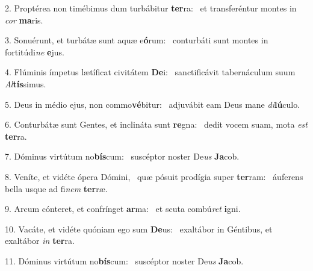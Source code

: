 2. Proptérea non timébimus dum turbábitur \textbf{ter}ra: \ast\  et transferéntur montes in \textit{cor} \textbf{ma}ris.\

3. Sonuérunt, et turbátæ sunt aquæ e\textbf{ó}rum: \ast\  conturbáti sunt montes in fortitúdi\textit{ne} \textbf{e}jus.\

4. Flúminis ímpetus lætíficat civitátem \textbf{De}i: \ast\  sanctificávit tabernáculum suum \textit{Al}\textbf{tís}simus.\

5. Deus in médio ejus, non commo\textbf{vé}bitur: \ast\  adjuvábit eam Deus mane \textit{di}\textbf{lú}culo.\

6. Conturbátæ sunt Gentes, et inclináta sunt \textbf{re}gna: \ast\  dedit vocem suam, mota \textit{est} \textbf{ter}ra.\

7. Dóminus virtútum no\textbf{bís}cum: \ast\  suscéptor noster De\textit{us} \textbf{Ja}cob.\

8. Veníte, et vidéte ópera Dómini, \dag\  quæ pósuit prodígia super \textbf{ter}ram: \ast\  áuferens bella usque ad fi\textit{nem} \textbf{ter}ræ.\

9. Arcum cónteret, et confrínget \textbf{ar}ma: \ast\  et scuta combú\textit{ret} \textbf{i}gni.\

10. Vacáte, et vidéte quóniam ego sum \textbf{De}us: \ast\  exaltábor in Géntibus, et exaltábor \textit{in} \textbf{ter}ra.\

11. Dóminus virtútum no\textbf{bís}cum: \ast\  suscéptor noster De\textit{us} \textbf{Ja}cob.\

